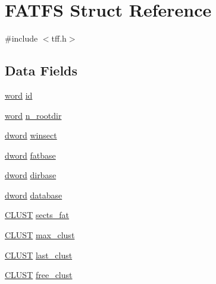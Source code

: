\hypertarget{struct_f_a_t_f_s}{\section{F\-A\-T\-F\-S Struct Reference}
\label{struct_f_a_t_f_s}
}


{\ttfamily \#include $<$tff.\-h$>$}

\subsection*{Data Fields}
\begin{DoxyCompactItemize}
\item 
\hyperlink{p8_2pinguino_2core_2typedef_8h_abad51e07ab6d26bec9f1f786c8d65bcd}{word} \hyperlink{struct_f_a_t_f_s_a588688f55d57bf8a7e8c1d2cf88a3c56}{id}
\item 
\hyperlink{p8_2pinguino_2core_2typedef_8h_abad51e07ab6d26bec9f1f786c8d65bcd}{word} \hyperlink{struct_f_a_t_f_s_a5d3e6d5008f57fc6450f4bfd072c5b81}{n\-\_\-rootdir}
\item 
\hyperlink{p8_2pinguino_2core_2typedef_8h_a74cb93d430006e784da73b8ca406ee6e}{dword} \hyperlink{struct_f_a_t_f_s_a5ee19a26d1dfd79d52fbba59cc792da3}{winsect}
\item 
\hyperlink{p8_2pinguino_2core_2typedef_8h_a74cb93d430006e784da73b8ca406ee6e}{dword} \hyperlink{struct_f_a_t_f_s_a4c158f002bd87f70c1595baef8888d96}{fatbase}
\item 
\hyperlink{p8_2pinguino_2core_2typedef_8h_a74cb93d430006e784da73b8ca406ee6e}{dword} \hyperlink{struct_f_a_t_f_s_a2152449dba421b7671f09ec7fcc7fa4e}{dirbase}
\item 
\hyperlink{p8_2pinguino_2core_2typedef_8h_a74cb93d430006e784da73b8ca406ee6e}{dword} \hyperlink{struct_f_a_t_f_s_ae3045fb3d76867c0cd17e6513000146b}{database}
\item 
\hyperlink{tff_8h_af322b62389c843d5727de4796a09f59c}{C\-L\-U\-S\-T} \hyperlink{struct_f_a_t_f_s_ac2ca607e168d57a4df8298dcffb2febf}{sects\-\_\-fat}
\item 
\hyperlink{tff_8h_af322b62389c843d5727de4796a09f59c}{C\-L\-U\-S\-T} \hyperlink{struct_f_a_t_f_s_aa628566fa0882ed951ed01fc6f20ff1b}{max\-\_\-clust}
\item 
\hyperlink{tff_8h_af322b62389c843d5727de4796a09f59c}{C\-L\-U\-S\-T} \hyperlink{struct_f_a_t_f_s_a07b2a137b54c6c95ffcee006c8906429}{last\-\_\-clust}
\item 
\hyperlink{tff_8h_af322b62389c843d5727de4796a09f59c}{C\-L\-U\-S\-T} \hyperlink{struct_f_a_t_f_s_a7976c77220d4840b68e2aef308c770e5}{free\-\_\-clust}

\end{DoxyCompactItemize}
